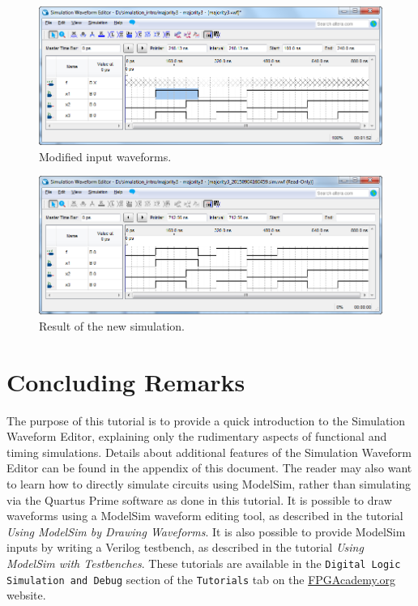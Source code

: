 \documentclass[11pt, twoside, pdftex]{article}
\begin{document}
\begin{figure}[H]
   \begin{center}
      \includegraphics[scale=0.65]{figures/figure18.png}
   \caption{Modified input waveforms.} 
	 \label{fig:18}
	 \end{center}
\end{figure}

\begin{figure}[H]
   \begin{center}
      \includegraphics[scale=0.65]{figures/figure19.png}
   \caption{Result of the new simulation.} 
	 \label{fig:19}
	 \end{center}
\end{figure}


\section{Concluding Remarks}

The purpose of this tutorial is to provide a quick introduction to the Simulation Waveform Editor, 
explaining only the rudimentary aspects of functional and timing simulations. Details about 
additional features of the Simulation Waveform Editor can be found in the appendix of this document. 
The reader may also want to learn how to directly simulate circuits using ModelSim, rather
than simulating via the Quartus Prime software as done in this tutorial. It is possible to
draw waveforms using a ModelSim waveform editing tool, as described in the tutorial
{\it Using ModelSim by Drawing Waveforms}.  It is also possible to provide ModelSim inputs
by writing a Verilog testbench, as described in the tutorial
{\it Using ModelSim with Testbenches}. These tutorials are available in the
\texttt{Digital Logic Simulation and Debug} section of the \texttt{Tutorials} tab on the 
{\href{https://www.fpgacademy.org/tutorials.html} {FPGAcademy.org}} website.
\end{document}

